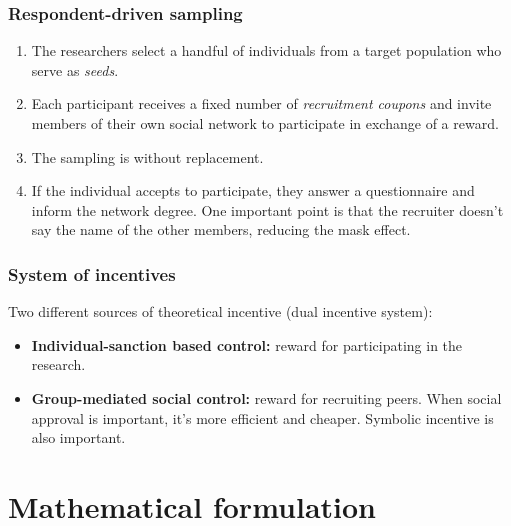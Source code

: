 \documentclass{beamer}
\newcommand{\Space}{\vspace{3ex}}
\begin{document}
\begin{frame}
  
  \frametitle{Respondent-driven sampling}

  \begin{enumerate}
    \item The researchers select a handful of individuals from a target
    population who serve as {\em seeds}.
    \item Each participant receives a fixed number of {\em recruitment coupons} and invite
    members of their own social network to participate in exchange of a
    reward.   
    \item The sampling is without replacement. 
    \item If the individual accepts to participate, they answer a
    questionnaire and inform the network degree. One important point is that
    the recruiter doesn't say the name of the other members, reducing the
    mask effect. 
  \end{enumerate}

\end{frame}

\begin{frame}
  
  \frametitle{System of incentives}
    
  Two different sources of theoretical incentive (dual incentive system):

  \Space

  \begin{itemize}
    \item {\bf Individual-sanction based control:} reward for participating
    in the research. 
    \item {\bf Group-mediated social control:} reward for recruiting peers.
    When social approval is important, it's more efficient and cheaper.
    Symbolic incentive is also important. 
  \end{itemize}

\end{frame}


\section{Mathematical formulation}
\end{document}
